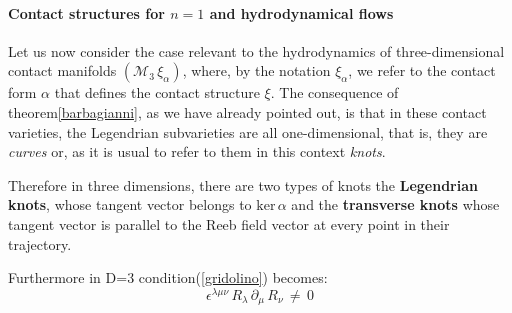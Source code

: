 \documentclass[10pt,a4paper]{article}
\begin{document}
\paragraph{\sc Contact structures for $n=1$ and  hydrodynamical flows}
Let us now consider the case relevant to the hydrodynamics of three-dimensional contact manifolds
$\left(\mathcal{M}_3\,\xi_\alpha\right)$, where, by the notation
$\xi_\alpha$, we refer to the contact form $\alpha$
that defines the contact structure $\xi$. The consequence of theorem\ref{barbagianni},
as we have already pointed out, is that in these contact varieties, the Legendrian subvarieties are all one-dimensional, that is, they are \textit{curves} or, as it is usual to refer to them in this context \textit{knots}.
\par
Therefore in three dimensions, there are two types of knots the \textbf{Legendrian knots}, whose tangent vector belongs to
$\text{ker}\, \alpha$  and the \textbf{transverse knots} whose tangent vector is parallel to the Reeb field vector at every point in their trajectory.
\par
Furthermore in D=3 condition(\ref{gridolino}) becomes:
\begin{equation}\label{urlonotturno}
    \epsilon^{\lambda\mu\nu}  \,R_\lambda \, \partial_\mu \, R_\nu
    \, \neq \, 0
\end{equation}
\end{document}
